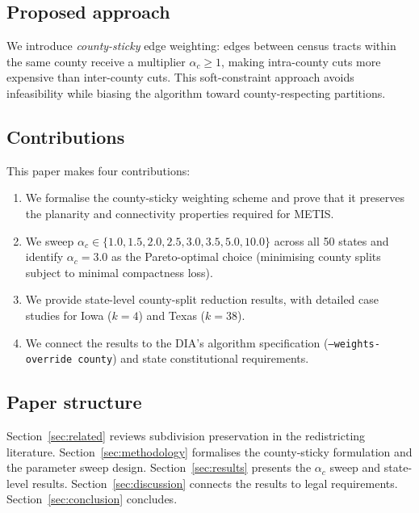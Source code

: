 \subsection*{Proposed approach}

We introduce \emph{county-sticky} edge weighting: edges between census
tracts within the same county receive a multiplier $\alpha_c \geq 1$,
making intra-county cuts more expensive than inter-county cuts.
This soft-constraint approach avoids infeasibility while biasing the
algorithm toward county-respecting partitions.

\subsection*{Contributions}

This paper makes four contributions:

\begin{enumerate}
  \item We formalise the county-sticky weighting scheme and prove that it
    preserves the planarity and connectivity properties required for METIS.
  \item We sweep $\alpha_c \in \{1.0, 1.5, 2.0, 2.5, 3.0, 3.5, 5.0, 10.0\}$ across
    all 50 states and identify $\alpha_c = 3.0$ as the Pareto-optimal
    choice (minimising county splits subject to minimal compactness loss).
  \item We provide state-level county-split reduction results, with detailed
    case studies for Iowa ($k{=}4$) and Texas ($k{=}38$).
  \item We connect the results to the DIA's algorithm specification
    (\texttt{--weights-override county}) and state constitutional requirements.
\end{enumerate}

\subsection*{Paper structure}

Section~\ref{sec:related} reviews subdivision preservation in the
redistricting literature.
Section~\ref{sec:methodology} formalises the county-sticky formulation
and the parameter sweep design.
Section~\ref{sec:results} presents the $\alpha_c$ sweep and state-level
results.
Section~\ref{sec:discussion} connects the results to legal requirements.
Section~\ref{sec:conclusion} concludes.
